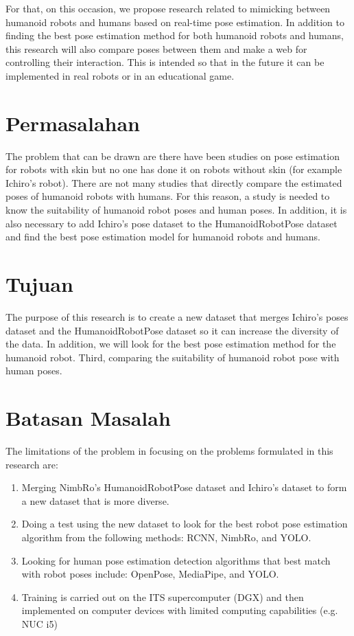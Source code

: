 For that, on this occasion, we propose research related to mimicking between humanoid robots and humans based on real-time pose estimation. 
In addition to finding the best pose estimation method for both humanoid robots and humans, this research will also compare poses between them and make a web for controlling their interaction.
This is intended so that in the future it can be implemented in real robots or in an educational game.

\section{Permasalahan}
\label{sec:permasalahan}

The problem that can be drawn are there have been studies on pose estimation for robots with skin but no one has done it on robots without skin (for example Ichiro's robot).
There are not many studies that directly compare the estimated poses of humanoid robots with humans. 
For this reason, a study is needed to know the suitability of humanoid robot poses and human poses. 
In addition, it is also necessary to add Ichiro's pose dataset to the HumanoidRobotPose dataset and find the best pose estimation model for humanoid robots and humans.

\section{Tujuan}
\label{sec:Tujuan}

The purpose of this research is to create a new dataset that merges Ichiro's poses dataset and the HumanoidRobotPose dataset so it can increase the diversity of the data. In addition,
we will look for the best pose estimation method for the humanoid robot. Third, comparing the suitability of humanoid robot pose with human poses.

\section{Batasan Masalah}
\label{sec:batasanmasalah}

The limitations of the problem in focusing on the problems formulated in this research are:

\begin{enumerate}[nolistsep]

  \item Merging NimbRo's HumanoidRobotPose dataset and Ichiro's dataset to form a new dataset that is more diverse.
  \item Doing a test using the new dataset to look for the best robot pose estimation algorithm from the following methods: RCNN, NimbRo, and YOLO.
  \item Looking for human pose estimation detection algorithms that best match with robot poses include: OpenPose, MediaPipe, and YOLO.
  \item Training is carried out on the ITS supercomputer (DGX) and then implemented on computer devices with limited computing capabilities (e.g. NUC i5)

\end{enumerate}

